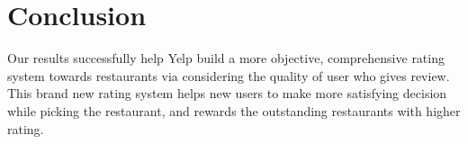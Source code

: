 \documentclass{stylefiles/capstone}
\begin{document}
\section{Conclusion}
Our results successfully help Yelp build a more objective, comprehensive rating system towards restaurants via considering the quality of user who gives review. This brand new rating system helps new users to make more satisfying decision while picking the restaurant, and rewards the outstanding restaurants with higher rating.



\end{document}
